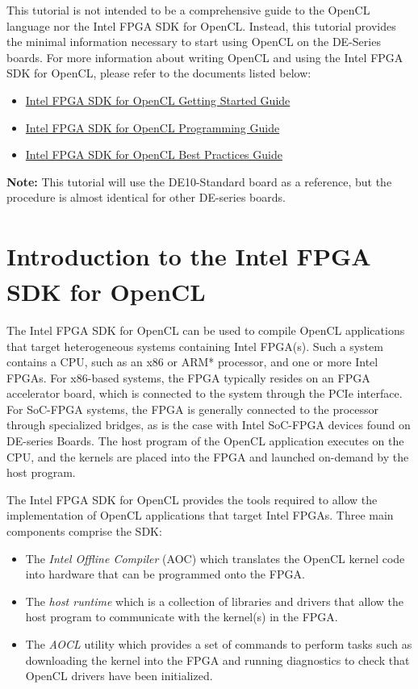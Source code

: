 \documentclass[11pt, twoside, pdftex]{article}
\begin{document}
This tutorial is not intended to be a comprehensive guide to the OpenCL language nor the Intel FPGA SDK for OpenCL. Instead, this tutorial provides the minimal information necessary to start using OpenCL on the DE-Series boards. For more information about writing OpenCL and using the Intel FPGA SDK for OpenCL, please refer to the documents listed below:

\begin{itemize}
\item \href{https://www.altera.com/documentation/mwh1391807309901.html}{Intel FPGA SDK for OpenCL Getting Started Guide}
\item \href{https://www.altera.com/documentation/mwh1391807516407.html}{Intel FPGA SDK for OpenCL Programming Guide}
\item \href{https://www.altera.com/documentation/mwh1391807965224.html}{Intel FPGA SDK for OpenCL Best Practices Guide}
\end{itemize}

\textbf{Note:} This tutorial will use the DE10-Standard board as a reference, but the procedure is almost identical for other DE-series boards.

\pagebreak

\section{Introduction to the Intel\textsuperscript{\textregistered} FPGA SDK for OpenCL\textsuperscript{\texttrademark}}

The Intel FPGA SDK for OpenCL can be used to compile OpenCL applications that target heterogeneous systems containing Intel FPGA(s). Such a system contains a CPU, such as an x86 or ARM* processor, and one or more Intel FPGAs. For x86-based systems, the FPGA typically resides on an FPGA accelerator board, which is connected to the system through the PCIe interface. For SoC-FPGA systems, the FPGA is generally connected to the processor through specialized bridges, as is the case with Intel SoC-FPGA devices found on DE-series Boards. The host program of the OpenCL application executes on the CPU, and the kernels are placed into the FPGA and launched on-demand by the host program. 

The Intel FPGA SDK for OpenCL provides the tools required to allow the implementation of OpenCL applications that target Intel FPGAs. Three main components comprise the SDK: 

\begin{itemize}
\item The \textit{Intel Offline Compiler} (AOC) which translates the OpenCL kernel code into hardware that can be programmed onto the FPGA.
\item The \textit{host runtime} which is a collection of libraries and drivers that allow the host program to communicate with the kernel(s) in the FPGA.
\item The \textit{AOCL} utility which provides a set of commands to perform tasks such as downloading the kernel into the FPGA and running diagnostics to check that OpenCL drivers have been initialized.
\end{itemize}
\end{document}

